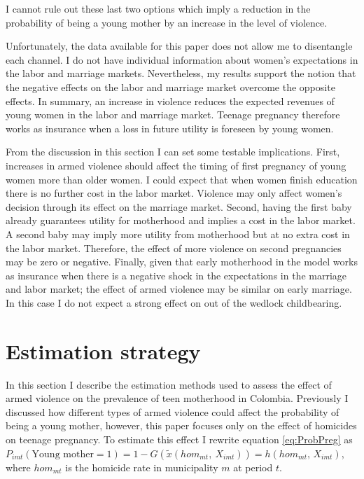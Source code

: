 \documentclass[a4paper,10pt,twocolumn,preprint,3p,authoryear]{elsarticle}
\begin{document}
I cannot rule out these last two options which imply a reduction in the probability of being a young mother by an increase in the level of violence.

Unfortunately, the data available for this paper does not allow me to disentangle each channel. I do not have individual information about women's expectations in the labor and marriage markets. Nevertheless, my results support the notion that the negative effects on the labor and marriage market overcome the opposite effects. In summary, an increase in violence reduces the expected revenues of young women in the labor and marriage market. Teenage pregnancy therefore works as insurance when a loss in future utility is foreseen by young women.

From the discussion in this section I can set some testable implications. First, increases in armed violence should affect the timing of first pregnancy of young women more than older women. I could expect that when women finish education there is no further cost in the labor market. Violence may only affect women's decision through its effect on the marriage market. Second, having the first baby already guarantees utility for motherhood and implies a cost in the labor market. A second baby may imply more utility from motherhood but at no extra cost in the labor market. Therefore, the effect of more violence on second pregnancies may be zero or negative. Finally, given that early motherhood in the model works as insurance when there is a negative shock in the expectations in the marriage and labor market; the effect of armed violence may be similar on early marriage. In this case I do not expect a strong effect on out of the wedlock childbearing.

\section{Estimation strategy\label{sec:EstStr}}

In this section I describe the estimation methods used to assess the effect of armed violence on the prevalence of teen motherhood in Colombia. Previously I discussed how different types of armed violence could affect the probability of being a young mother, however, this paper focuses only on the effect of homicides on teenage pregnancy. To estimate this effect I rewrite equation \ref{eq:ProbPreg} as $P_{imt}\left(\textrm{Young mother} = 1\right)=1 - G\left( \tilde{x}\left(hom_{mt},\ X_{imt}  \right)\right) = h\left(hom_{mt},\,X_{imt}\right)$, where $hom_{mt}$ is the homicide rate in municipality $m$ at period $t$. 
\end{document}
